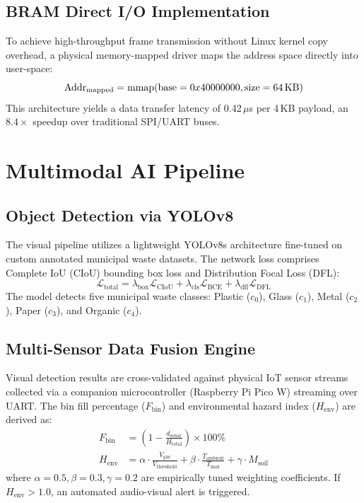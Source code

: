 \documentclass[conference]{IEEEtran}
\begin{document}
\subsection{BRAM Direct I/O Implementation}
To achieve high-throughput frame transmission without Linux kernel copy overhead, a physical memory-mapped driver maps the address space directly into user-space:
\begin{equation}
\text{Addr}_{\text{mapped}} = \text{mmap}(\text{base}=0x40000000, \text{size}=64\text{\,KB})
\end{equation}
This architecture yields a data transfer latency of 0.42\,$\mu$s per 4\,KB payload, an $8.4\times$ speedup over traditional SPI/UART buses.

\section{Multimodal AI Pipeline}

\subsection{Object Detection via YOLOv8}
The visual pipeline utilizes a lightweight YOLOv8s architecture fine-tuned on custom annotated municipal waste datasets. The network loss comprises Complete IoU (CIoU) bounding box loss and Distribution Focal Loss (DFL):
\begin{equation}
\mathcal{L}_{\text{total}} = \lambda_{\text{box}} \mathcal{L}_{\text{CIoU}} + \lambda_{\text{cls}} \mathcal{L}_{\text{BCE}} + \lambda_{\text{dfl}} \mathcal{L}_{\text{DFL}}
\end{equation}
The model detects five municipal waste classes: Plastic ($c_0$), Glass ($c_1$), Metal ($c_2$), Paper ($c_3$), and Organic ($c_4$).

\subsection{Multi-Sensor Data Fusion Engine}
Visual detection results are cross-validated against physical IoT sensor streams collected via a companion microcontroller (Raspberry Pi Pico W) streaming over UART. The bin fill percentage ($F_{\text{bin}}$) and environmental hazard index ($H_{\text{env}}$) are derived as:
\begin{align}
F_{\text{bin}} &= \left(1 - \frac{d_{\text{sonar}}}{H_{\text{total}}}\right) \times 100\% \\
H_{\text{env}} &= \alpha \cdot \frac{V_{\text{gas}}}{V_{\text{threshold}}} + \beta \cdot \frac{T_{\text{ambient}}}{T_{\text{max}}} + \gamma \cdot M_{\text{soil}}
\end{align}
where $\alpha=0.5, \beta=0.3, \gamma=0.2$ are empirically tuned weighting coefficients. If $H_{\text{env}} > 1.0$, an automated audio-visual alert is triggered.
\end{document}
